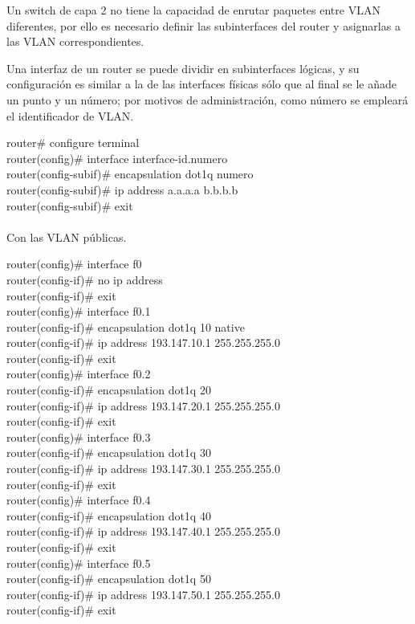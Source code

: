 \documentclass[a4paper,10pt]{article}
\begin{document}
\begin{itemize}
Un switch de capa 2 no tiene la capacidad de enrutar paquetes entre VLAN diferentes, por ello es necesario definir las subinterfaces del router y asignarlas a las VLAN correspondientes.

Una interfaz de un router se puede dividir en subinterfaces lógicas, y su configuración es similar a la de las interfaces físicas sólo que al final se le añade un punto y un número; por motivos de administración, como número se empleará el identificador de VLAN.

\textsf{router\# configure terminal\\
router(config)\# interface interface-id.numero\\
router(config-subif)\# encapsulation dot1q numero\\
router(config-subif)\# ip address a.a.a.a b.b.b.b\\
router(config-subif)\# exit\\}\\
Con las VLAN públicas.

\textsf{router(config)\# interface f0\\
router(config-if)\# no ip address\\
router(config-if)\# exit\\ 
router(config)\# interface f0.1\\
router(config-if)\# encapsulation dot1q 10 native\\
router(config-if)\# ip address 193.147.10.1 255.255.255.0\\
router(config-if)\# exit\\ 
router(config)\# interface f0.2\\
router(config-if)\# encapsulation dot1q 20\\
router(config-if)\# ip address 193.147.20.1 255.255.255.0\\
router(config-if)\# exit\\ 
router(config)\# interface f0.3\\
router(config-if)\# encapsulation dot1q 30\\
router(config-if)\# ip address 193.147.30.1 255.255.255.0\\
router(config-if)\# exit\\
router(config)\# interface f0.4\\
router(config-if)\# encapsulation dot1q 40\\
router(config-if)\# ip address 193.147.40.1 255.255.255.0\\
router(config-if)\# exit\\
router(config)\# interface f0.5\\
router(config-if)\# encapsulation dot1q 50\\
router(config-if)\# ip address 193.147.50.1 255.255.255.0\\
router(config-if)\# exit\\}\\
\end{itemize}
\end{document}
